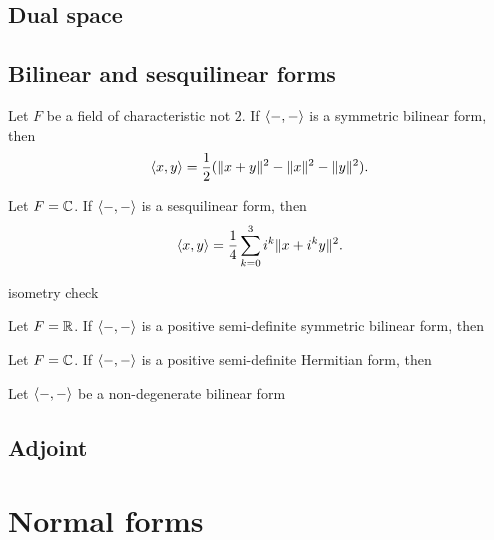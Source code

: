 \documentclass{../note}
\begin{document}
\section{Dual space}

\begin{prb}
\end{prb}

\section{Bilinear and sesquilinear forms}

\begin{prb}
\begin{parts}
\item Let $F$ be a field of characteristic not $2$. If $\langle-,-\rangle$ is a symmetric bilinear form, then
\[\langle x,y\rangle=\frac12(\|x+y\|^2-\|x\|^2-\|y\|^2).\]
\item Let $F=\mathbb{C}$. If $\langle-,-\rangle$ is a sesquilinear form, then
\[\langle x,y\rangle=\frac14\sum_{k=0}^3i^k\|x+i^ky\|^2.\]
\item isometry check
\end{parts}
\end{prb}

\begin{prb}
\begin{parts}
\item Let $F=\mathbb{R}$. If $\langle-,-\rangle$ is a positive semi-definite symmetric bilinear form, then
\item Let $F=\mathbb{C}$. If $\langle-,-\rangle$ is a positive semi-definite Hermitian form, then
\end{parts}
\end{prb}

\begin{prb}
Let $\langle-,-\rangle$ be a non-degenerate bilinear form
\end{prb}

\section{Adjoint}
\begin{prb}
\end{prb}







\chapter{Normal forms}
\end{document}
